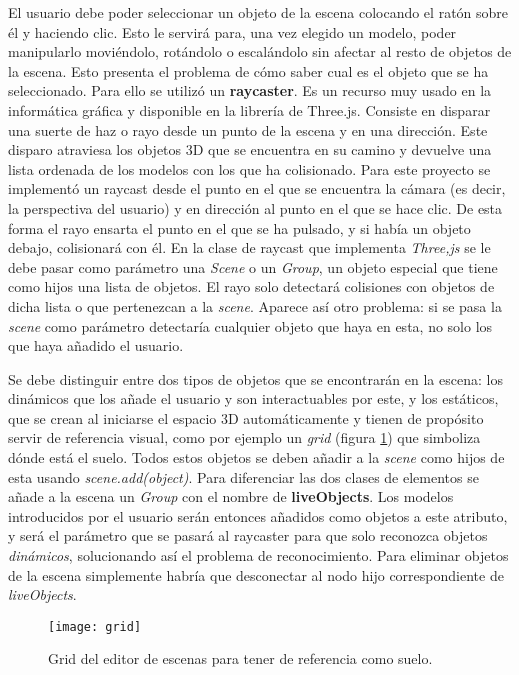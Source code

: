 El usuario debe poder seleccionar un objeto de la escena colocando el ratón sobre él y haciendo clic. Esto le servirá para, una vez elegido un modelo, poder manipularlo moviéndolo, rotándolo o escalándolo sin afectar al resto de objetos de la escena. Esto presenta el problema de cómo saber cual es el objeto que se ha seleccionado. Para ello se utilizó un \textbf{raycaster}. Es un recurso muy usado en la informática gráfica y disponible en la librería de Three.js. Consiste en disparar una suerte de haz o rayo desde un punto de la escena y en una dirección. Este disparo atraviesa los objetos 3D que se encuentra en su camino y devuelve una lista ordenada de los modelos con los que ha colisionado. Para este proyecto se implementó un raycast desde el punto en el que se encuentra la cámara (es decir, la perspectiva del usuario) y en dirección al punto en el que se hace clic. De esta forma el rayo ensarta el punto en el que se ha pulsado, y si había un objeto debajo, colisionará con él. En la clase de raycast que implementa \textit{Three,js} se le debe pasar como parámetro una \textit{Scene} o un \textit{Group}, un objeto especial que tiene como hijos una lista de objetos. El rayo solo detectará colisiones con objetos de dicha lista o que pertenezcan a la \textit{scene}. Aparece así otro problema: si se pasa la \textit{scene} como parámetro detectaría cualquier objeto que haya en esta, no solo los que haya añadido el usuario.

Se debe distinguir entre dos tipos de objetos que se encontrarán en la escena: los dinámicos que los añade el usuario y son interactuables por este, y los estáticos, que se crean al iniciarse el espacio 3D automáticamente y tienen de propósito servir de referencia visual, como por ejemplo un \textit{grid} (figura \ref{fig:grid}) que simboliza dónde está el suelo. Todos estos objetos se deben añadir a la \textit{scene} como hijos de esta usando \textit{scene.add(object)}. Para diferenciar las dos clases de elementos se añade a la escena un \textit{Group} con el nombre de \textbf{liveObjects}. Los modelos introducidos por el usuario serán entonces añadidos como objetos a este atributo, y será el parámetro que se pasará al raycaster para que solo reconozca objetos \textit{dinámicos}, solucionando así el problema de reconocimiento. Para eliminar objetos de la escena simplemente habría que desconectar al nodo hijo correspondiente de \textit{liveObjects}.

\begin{figure}[h]
    \centering
    \texttt{[image: grid]}
    \caption[Grid del editor de escenas]{Grid del editor de escenas para tener de referencia como suelo.}
    \label{fig:grid}
\end{figure}

